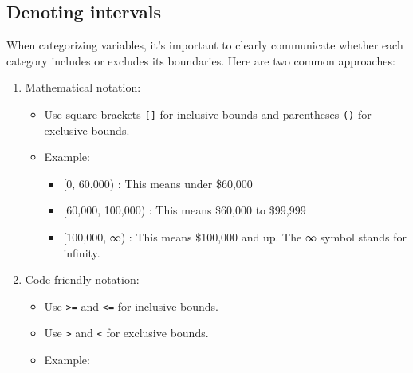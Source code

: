 \documentclass[
  letterpaper,
  DIV=11,
  numbers=noendperiod]{scrreprt}
\providecommand{\tightlist}{%
  \setlength{\itemsep}{0pt}\setlength{\parskip}{0pt}}\usepackage{longtable,booktabs,array}
\begin{document}
\begin{tcolorbox}[enhanced jigsaw, colframe=quarto-callout-note-color-frame, opacityback=0, titlerule=0mm, bottomrule=.15mm, breakable, leftrule=.75mm, colbacktitle=quarto-callout-note-color!10!white, title=\textcolor{quarto-callout-note-color}{\faInfo}\hspace{0.5em}{Pro-tip}, rightrule=.15mm, coltitle=black, opacitybacktitle=0.6, colback=white, left=2mm, arc=.35mm, toptitle=1mm, bottomtitle=1mm, toprule=.15mm]

\section{Denoting intervals}\label{denoting-intervals}

When categorizing variables, it's important to clearly communicate
whether each category includes or excludes its boundaries. Here are two
common approaches:

\begin{enumerate}
\def\labelenumi{\arabic{enumi}.}
\tightlist
\item
  Mathematical notation:

  \begin{itemize}
  \tightlist
  \item
    Use square brackets \texttt{{[}{]}} for inclusive bounds and
    parentheses \texttt{()} for exclusive bounds.
  \item
    Example:

    \begin{itemize}
    \tightlist
    \item
      {[}0, 60,000) : This means under \$60,000
    \item
      {[}60,000, 100,000) : This means \$60,000 to \$99,999
    \item
      {[}100,000, ∞) : This means \$100,000 and up. The ∞ symbol stands
      for infinity.
    \end{itemize}
  \end{itemize}
\item
  Code-friendly notation:

  \begin{itemize}
  \tightlist
  \item
    Use \texttt{\textgreater{}=} and \texttt{\textless{}=} for inclusive
    bounds.
  \item
    Use \texttt{\textgreater{}} and \texttt{\textless{}} for exclusive
    bounds.
  \item
    Example:


\end{itemize}
\end{enumerate}
\end{tcolorbox}
\end{document}
